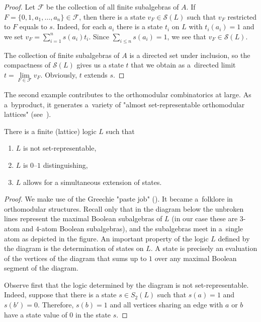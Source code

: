 \documentclass{article}
\begin{document}
{\begin{proof}
Let $\mathcal F$ be the collection of all finite subalgebras of $A$. If
$F=\{0,1,a_1,\dots,a_n\}\in\mathcal F$,
then there is a state $v_F\in \mathcal{S}(L)$ such that $v_F$ restricted to $F$ equals to $s$.
Indeed, for each $a_i$ there is a state $t_i$ on $L$ with
$t_i(a_i)=1$ and we set $v_F=\sum_{i=1}^{n}s(a_i)t_i$.
Since $\sum_{i \leq n}s(a_i)=1$, we see that $v_F\in \mathcal{S}(L)$.

The collection of finite subalgebras of $A$ is a directed set under inclusion, so the compactness of $\mathcal{S}(L)$ gives us a state
$t$ that we obtain as a~directed limit $t=\lim\limits_{F\in\mathcal F}v_F$.
Obviously, $t$ extends $s$.
\end{proof}

The second example contributes to the orthomodular combinatorics at large. As a~byproduct, it generates a~variety of "almost set-representable orthomodular lattices" (see~\cite{Mayet, MayetPtak}).

\begin{proposition}
There is a finite (lattice) logic $L$ such that

\begin{enumerate}
\item $L$ is not set-representable,
\item $L$ is $0$--$1$ distinguishing,
\item $L$ allows for a simultaneous extension of states.
\end{enumerate}
\end{proposition}

\begin{proof}
We make use of the Greechie "paste job" (\cite{Greechie}). 
It became a~folklore in orthomodular structures.
Recall only that in the
diagram below the unbroken lines represent the maximal Boolean
subalgebras of $L$ (in our case these are $3$-atom and
$4$-atom Boolean subalgebras), and the subalgebras meet in
a~single atom as depicted in the figure. An important property of the logic $L$ defined by the
diagram is the determination of states on $L$. A state is
precisely an evaluation of the vertices of the diagram
that sums up to $1$ over any maximal Boolean segment of
the diagram.



Observe first that the logic determined by the diagram is
not set-representable. Indeed, suppose that there is a
state $s\in S_2(L)$ such that
$s(a)=1$ and $s(b')=0$. Therefore, $s(b)=1$ and all vertices sharing an edge with $a$ or $b$ have a state value of $0$ in the state $s$.


\end{proof}}
\end{document}
